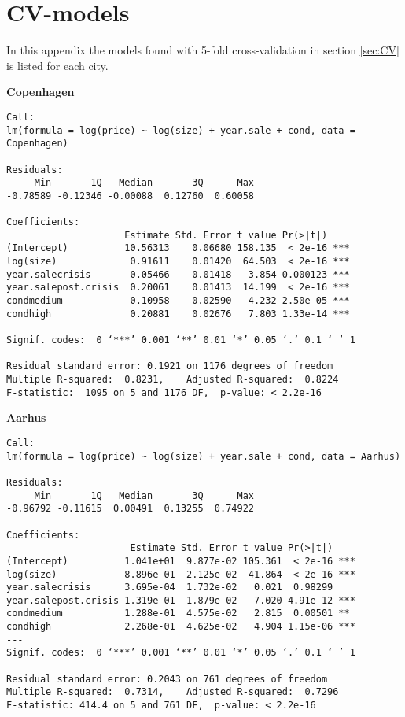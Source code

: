 \chapter{CV-models} \label{aap:cv}
In this appendix the models found with 5-fold cross-validation in section \ref{sec:CV} is listed for each city.

\textbf{Copenhagen}
\begin{lstlisting}
Call:
lm(formula = log(price) ~ log(size) + year.sale + cond, data = Copenhagen)

Residuals:
     Min       1Q   Median       3Q      Max 
-0.78589 -0.12346 -0.00088  0.12760  0.60058 

Coefficients:
                     Estimate Std. Error t value Pr(>|t|)    
(Intercept)          10.56313    0.06680 158.135  < 2e-16 ***
log(size)             0.91611    0.01420  64.503  < 2e-16 ***
year.salecrisis      -0.05466    0.01418  -3.854 0.000123 ***
year.salepost.crisis  0.20061    0.01413  14.199  < 2e-16 ***
condmedium            0.10958    0.02590   4.232 2.50e-05 ***
condhigh              0.20881    0.02676   7.803 1.33e-14 ***
---
Signif. codes:  0 ‘***’ 0.001 ‘**’ 0.01 ‘*’ 0.05 ‘.’ 0.1 ‘ ’ 1

Residual standard error: 0.1921 on 1176 degrees of freedom
Multiple R-squared:  0.8231,	Adjusted R-squared:  0.8224 
F-statistic:  1095 on 5 and 1176 DF,  p-value: < 2.2e-16
\end{lstlisting}

\textbf{Aarhus}
\begin{lstlisting}
Call:
lm(formula = log(price) ~ log(size) + year.sale + cond, data = Aarhus)

Residuals:
     Min       1Q   Median       3Q      Max 
-0.96792 -0.11615  0.00491  0.13255  0.74922 

Coefficients:
                      Estimate Std. Error t value Pr(>|t|)    
(Intercept)          1.041e+01  9.877e-02 105.361  < 2e-16 ***
log(size)            8.896e-01  2.125e-02  41.864  < 2e-16 ***
year.salecrisis      3.695e-04  1.732e-02   0.021  0.98299    
year.salepost.crisis 1.319e-01  1.879e-02   7.020 4.91e-12 ***
condmedium           1.288e-01  4.575e-02   2.815  0.00501 ** 
condhigh             2.268e-01  4.625e-02   4.904 1.15e-06 ***
---
Signif. codes:  0 ‘***’ 0.001 ‘**’ 0.01 ‘*’ 0.05 ‘.’ 0.1 ‘ ’ 1

Residual standard error: 0.2043 on 761 degrees of freedom
Multiple R-squared:  0.7314,	Adjusted R-squared:  0.7296 
F-statistic: 414.4 on 5 and 761 DF,  p-value: < 2.2e-16
\end{lstlisting}

